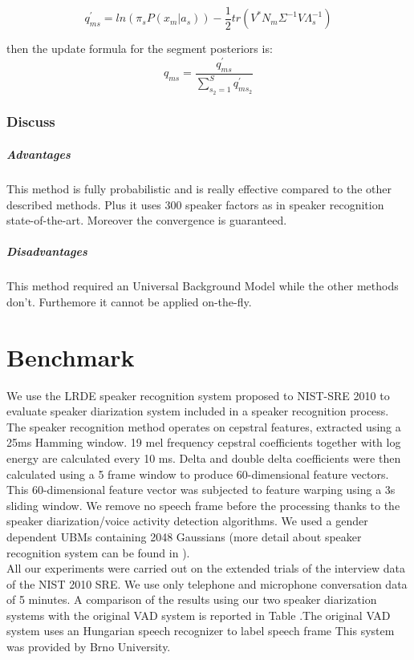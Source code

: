 \documentclass{techrep} %
\begin{document}
$$q_{ms}^{'} = ln(\pi_sP(x_m|a_s)) - \frac{1}{2}tr(V^*N_m\Sigma^{-1}V\Lambda_s^{-1})$$

then the update formula for the segment posteriors is:
$$q_{ms} = \frac{q_{ms}^{'}}{\sum_{s_2=1}^{S}{q_{ms_2}^{'}}}$$%
\subsection{Discuss}
\paragraph{Advantages} This method is fully probabilistic and is really effective compared to the other described methods. Plus it uses 300 speaker factors as in speaker recognition state-of-the-art. Moreover the convergence is guaranteed.

\paragraph{Disadvantages} This method required an Universal Background Model while the other methods don't. Furthemore it cannot be applied on-the-fly.
\chapter{Benchmark}

We use the LRDE speaker recognition system proposed to NIST-SRE 2010
to evaluate speaker diarization system included in a speaker
recognition process. The speaker recognition method operates on
cepstral features, extracted using a 25ms Hamming window. 19 mel
frequency cepstral coefficients together with log energy are
calculated every 10 ms. Delta and double delta coefficients were then
calculated using a 5 frame window to produce 60-dimensional feature
vectors. This 60-dimensional feature vector was subjected to feature
warping using a 3s sliding window. We remove no speech frame before
the processing thanks to the speaker diarization/voice activity
detection algorithms. We used a gender dependent UBMs containing 2048
Gaussians (more detail about speaker recognition system can be found
in \cite{dehak.icassp.2011}).\\

All our experiments were carried out on the extended trials of the
interview data of the NIST 2010 SRE. We use only telephone and
microphone conversation data of 5 minutes. A comparison of the results
using our two speaker diarization systems with the original VAD system
is reported in Table %
.The original VAD system uses
an Hungarian speech recognizer to label speech frame
This system was provided by Brno University.\\
\end{document}
